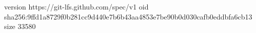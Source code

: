 version https://git-lfs.github.com/spec/v1
oid sha256:9ffd1a8729f0b281cc9d440e7b6b43aa4853e7be90b0d030cafb0eddbfa6cb13
size 33580
